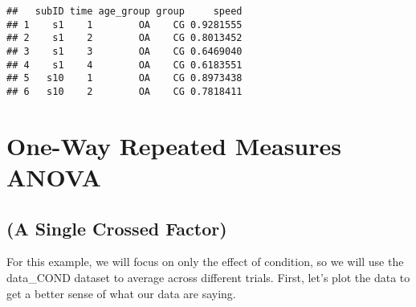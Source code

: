 \documentclass[]{article}
\begin{document}
\begin{verbatim}
##   subID time age_group group     speed
## 1    s1    1        OA    CG 0.9281555
## 2    s1    2        OA    CG 0.8013452
## 3    s1    3        OA    CG 0.6469040
## 4    s1    4        OA    CG 0.6183551
## 5   s10    1        OA    CG 0.8973438
## 6   s10    2        OA    CG 0.7818411
\end{verbatim}

\hypertarget{one-way-repeated-measures-anova}{%
\section{One-Way Repeated Measures
ANOVA}\label{one-way-repeated-measures-anova}}

\hypertarget{a-single-crossed-factor}{%
\subsection{(A Single Crossed Factor)}\label{a-single-crossed-factor}}

For this example, we will focus on only the effect of condition, so we
will use the data\_COND dataset to average across different trials.
First, let's plot the data to get a better sense of what our data are
saying.
\end{document}
